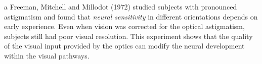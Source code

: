 a\nocite{FreemanMitchellMillodot}	%
Freeman, Mitchell and Millodot (1972) studied
subjects with pronounced astigmatism 
and found that {\em neural sensitivity} in different orientations
depends on early experience.
Even when vision was corrected for the optical astigmatism,
subjects still had poor visual resolution.
This experiment shows that
the quality of the visual input provided by the optics
can modify the neural development within the visual pathways.
